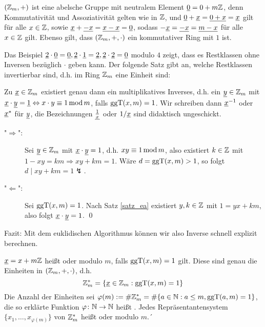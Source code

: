 \begin{folg}
	$(\mathbb{Z}_m,+)$ ist eine abelsche Gruppe mit neutralem Element $\uline{0} = 0 + m\ZZ$, denn Kommutativität und Assoziativität gelten wie in $\mathbb{Z}$, und $\uline{0} + \uline{x} = \uline{0+x} = \uline{x}$ gilt für alle $x \in \mathbb{Z}$, sowie $\uline{x} + \uline{-x} = \uline{x-x} = \uline{0}$, sodass $-\uline{x} = \uline{-x} = \uline{m-x}$ für alle $x \in \mathbb{Z}$ gilt. Ebenso gilt, dass $(\mathbb{Z}_m,+,\cdot)$ ein kommutativer Ring mit $1$ ist.
\end{folg}

Das Beispiel $\uline{2} \cdot \uline{0} = \uline{0}, \uline{2} \cdot \uline{1} = \uline{2}, \uline{2} \cdot \uline{2} = \uline{0}$ modulo $4$ zeigt, dass es Restklassen ohne Inversen bezüglich $\cdot$ geben kann. Der folgende Satz gibt an, welche Restklassen invertierbar sind, d.h. im Ring $\ZZ_m$ eine Einheit sind:

\begin{satz}[Einheiten in $\ZZ_m$]
	Zu $\uline{x} \in \ZZ_m$ existiert genau dann ein multiplikatives Inverses, d.h. ein $\uline{y} \in \ZZ_m$ mit $\uline{x} \cdot \uline{y} = \uline{1} \Leftrightarrow x \cdot y \kon 1 \modu m$, falls $\operatorname{ggT}(x,m) = 1$. Wir schreiben dann $\uline{x}^{-1}$ oder $\uline{x}^*$ für $\uline{y}$, die Bezeichnungen $\uline{\frac{1}{x}}$ oder $1/\uline{x}$ sind didaktisch ungeschickt.
\end{satz}

	\begin{description}
		\item["$\Rightarrow$":] Sei $\uline{y} \in \ZZ_m$ mit $\uline{x} \cdot \uline{y} = 1$, d.h. $xy \equiv 1 \operatorname{mod} m$, also existiert $k \in \mathbb{Z}$ mit $1 - xy = km \Rightarrow xy + km = 1$. Wäre $d = \operatorname{ggT}(x,m) > 1$, so folgt $d \mid xy + km = 1 \lightning$.
		\item["$\Leftarrow$":] Sei $\operatorname{ggT}(x,m) = 1$. Nach Satz \ref{satz_ea} existiert $y,k \in \mathbb{Z}$ mit $1 = yx + km$, also folgt $\uline{x} \cdot \uline{y} = 1$. \qed
	\end{description}

Fazit: Mit dem euklidischen Algorithmus können wir also Inverse schnell explizit berechnen.

\begin{defn}
	$\uline{x} = x + m\ZZ$ heißt  oder  modulo $m$, falls $\operatorname{ggT}(x,m) = 1$ gilt. Diese sind genau die Einheiten in $(\mathbb{Z}_m,+,\cdot)$, d.h.
	\[ \ZZ_m^* = \{\uline{x} \in \ZZ_m : \ggT(x,m) = 1\} \]
	Die Anzahl der Einheiten sei $\varphi(m) := \# \mathbb{Z}_m^* = \# \{a \in \mathbb{N} : a \leq m, \operatorname{ggT}(a,m) = 1\}$, die so erklärte Funktion $\varphi\colon \mathbb{N} \rightarrow \mathbb{N}$ heißt . Jedes Repräsentantensystem $\{x_1, \dots, x_{\varphi(m)}\}$ von $\mathbb{Z}_m^*$ heißt  oder  modulo $m$.´ 
\end{defn}

